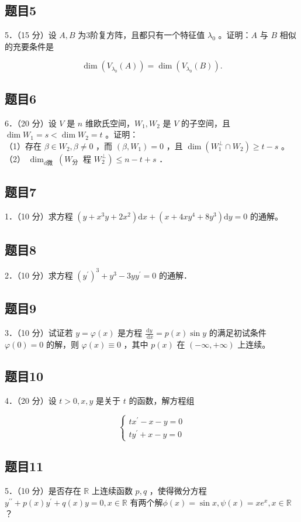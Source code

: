 \documentclass{article}
\begin{document}
\subsection{题目5}
5．（15 分）设 \(A, B\) 为3阶复方阵，且都只有一个特征值 \(\lambda_{0}\) 。证明：\(A\) 与 \(B\) 相似的充要条件是

\[
\operatorname{dim}\left(V_{\lambda_{0}}(A)\right)=\operatorname{dim}\left(V_{\lambda_{0}}(B)\right) .
\]

\subsection{题目6}
6．（20 分）设 \(V\) 是 \(n\) 维欧氏空间，\(W_{1}, W_{2}\) 是 \(V\) 的子空间，且 \(\operatorname{dim} W_{1}=s<\operatorname{dim} W_{2}=t\) 。证明：\\
（1）存在 \(\beta \in W_{2}, \beta \neq 0\) ，而 \(\left(\beta, W_{1}\right)=0\) ，且 \(\operatorname{dim}\left(W_{1}^{\perp} \cap W_{2}\right) \geq t-s\) 。\\
（2） \(\operatorname{dim}_{\text {d微 }}\left(W_{\text {分 }}\right.\) 程 \(\left.W_{2}^{\perp}\right) \leq n-t+s\) ．\\

\subsection{题目7}
1．（10 分）求方程 \(\left(y+x^{3} y+2 x^{2}\right) \mathrm{d} x+\left(x+4 x y^{4}+8 y^{3}\right) \mathrm{d} y=0\) 的通解。\\

\subsection{题目8}
2．（10 分）求方程 \(\left(y^{\prime}\right)^{3}+y^{3}-3 y y^{\prime}=0\) 的通解．\\

\subsection{题目9}
3．（10 分）试证若 \(y=\varphi(x)\) 是方程 \(\frac{\mathrm{d} y}{\mathrm{~d} x}=p(x) \sin y\) 的满足初试条件 \(\varphi(0)=0\) 的解，则 \(\varphi(x) \equiv 0\) ，其中 \(p(x)\) 在 \((-\infty,+\infty)\) 上连续。\\

\subsection{题目10}
4．（20 分）设 \(t>0, x, y\) 是关于 \(t\) 的函数，解方程组

\[
\left\{\begin{array}{l}
t x^{\prime}-x-y=0 \\
t y^{\prime}+x-y=0
\end{array}\right.
\]

\subsection{题目11}
5．（10 分）是否存在 \(\mathbb{R}\) 上连续函数 \(p, q\) ，使得微分方程 \(y^{\prime \prime}+p(x) y^{\prime}+q(x) y=0, x \in \mathbb{R}\) 有两个解\(\phi(x)=\sin x, \psi(x)=x e^{x}, x \in \mathbb{R}\) ？
\end{document}
